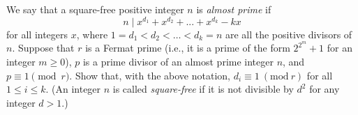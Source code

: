 \documentclass{article}
\begin{document}
\setlength{\parindent}{0pt}
We say that a square-free positive integer $n$ is \emph{almost prime} if$$ n \mid x^{d_1}+x^{d_2}+...+x^{d_k}-kx $$for all integers $x$, where $1=d_1<d_2<\dots<d_k=n$ are all the positive divisors of $n$. Suppose that $r$ is a Fermat prime (i.e., it is a prime of the form $2^{2^m}+1$ for an integer $m\geq 0$), $p$ is a prime divisor of an almost prime integer $n$, and $p\equiv 1\pmod r$. Show that, with the above notation, $d_i\equiv 1\ (\mathrm{mod}\ r)$ for all $1\leq i\leq k$.\newline
(An integer $n$ is called \emph{square-free} if it is not divisible by $d^2$ for any integer $d>1$.)
\end{document}
